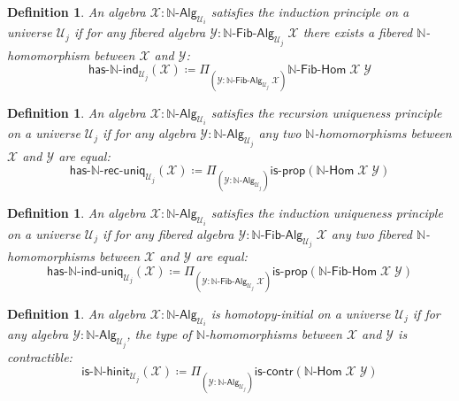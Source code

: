 \documentclass[reqno,10pt,a4paper,oneside]{amsart}
\newcommand{\X}{\mathcal{X}}
\newcommand{\Y}{\mathcal{Y}}
\newcommand{\prd}[1]{\Pi_{#1}}
\newcommand{\defeq}{\coloneqq}
\newcommand{\nat}{\ensuremath{\mathbb{N}}}
\newcommand{\UU}{\mathcal{U}}
\newcommand{\NatAlg}{\nat\text{-}\mathsf{Alg}}
\newcommand{\NatHom}{\nat\text{-}\mathsf{Hom}}
\newcommand{\HasNatInd}{\mathsf{has}\text{-}\nat\text{-}\mathsf{ind}}
\newcommand{\HasNatRecUniq}{\mathsf{has}\text{-}\nat\text{-}\mathsf{rec}\text{-}\mathsf{uniq}}
\newcommand{\HasNatIndUniq}{\mathsf{has}\text{-}\nat\text{-}\mathsf{ind}\text{-}\mathsf{uniq}}
\newcommand{\NatFibAlg}{\nat\text{-}\mathsf{Fib}\text{-}\mathsf{Alg}}
\newcommand{\NatFibHom}{\nat\text{-}\mathsf{Fib}\text{-}\mathsf{Hom}}
\newcommand{\IsNatHInit}{\mathsf{is}\text{-}\nat\text{-}\mathsf{hinit}}
\newcommand{\iscontr}{\mathsf{is}\text{-}\mathsf{contr}}
\newcommand{\isprop}{\mathsf{is}\text{-}\mathsf{prop}}
\numberwithin{equation}{section}
\theoremstyle{mythm}
\theoremstyle{mydef}
\newtheorem{definition}[theorem]{Definition}
\theoremstyle{myrmk}
\begin{document}
\begin{definition}\label{def:NatInd}
An algebra $\mathcal{X} : \NatAlg_{\UU_i}$ \emph{satisfies the induction principle} on a universe $\UU_j$ if for any 
fibered algebra $\Y : \NatFibAlg_{\UU_j} \; \X$ there exists a fibered $\nat$-homomorphism between $\X$ and $\Y$:
\[\HasNatInd_{\UU_j}(\X) \defeq \prd{(\Y:\NatFibAlg_{\UU_j} \; \X)} \NatFibHom \; \X \; \Y\] 
\end{definition}

\begin{definition}\label{def:NatRecUniq}
An algebra $\X : \NatAlg_{\UU_i}$ satisfies the \emph{recursion uniqueness principle} on a universe $\UU_j$ if for any algebra $\Y : \NatAlg_{\UU_j}$ any two $\nat$-homomorphisms between $\X$ and $\Y$ are equal:
\[ \HasNatRecUniq_{\UU_j}(\X) \defeq \prd{(\Y:\NatAlg_{\UU_j})} \isprop(\NatHom \; \X \; \Y)\]
\end{definition}

\begin{definition}\label{def:NatIndUniq}
An algebra $\X : \NatAlg_{\UU_i}$ satisfies the \emph{induction uniqueness principle} on a universe $\UU_j$ if for any fibered algebra $\Y : \NatFibAlg_{\UU_j}\;\X$ any two fibered $\nat$-homomorphisms between $\X$ and $\Y$ are equal:
\[ \HasNatIndUniq_{\UU_j}(\X) \defeq \prd{(\Y:\NatFibAlg_{\UU_j} \; \X)} \isprop(\NatFibHom \; \X \; \Y)\]
\end{definition}

\begin{definition}\label{def:NatInit}
An algebra $\X : \NatAlg_{\UU_i}$ is \emph{homotopy-initial} on a universe $\UU_j$ if for any algebra $\Y : \NatAlg_{\UU_j}$, the type of $\nat$-homomorphisms between $\X$ and $\Y$ is contractible:
\[ \IsNatHInit_{\UU_j}(\X) \defeq \prd{(\Y:\NatAlg_{\UU_j})} \iscontr(\NatHom \; \X \; \Y) \]  
\end{definition}
\end{document}
